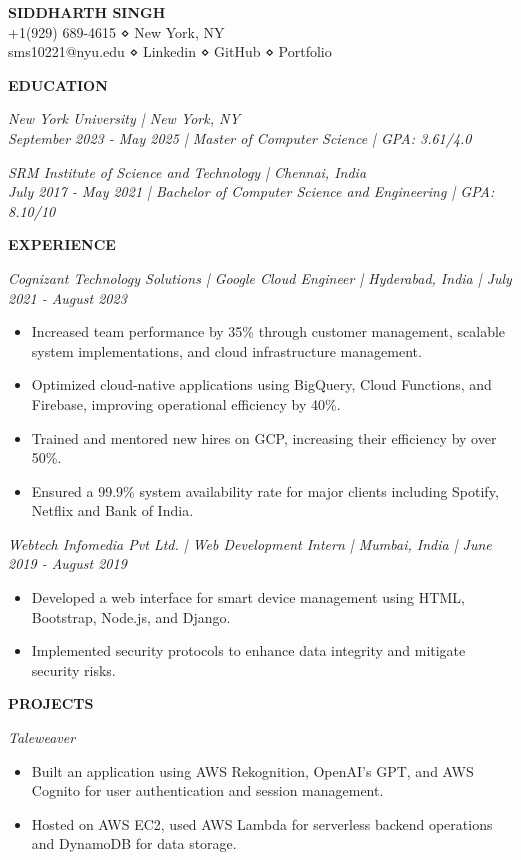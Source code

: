 \documentclass[letterpaper,11pt]{article}
\begin{document}
\noindent
\textbf{\Large SIDDHARTH SINGH} \\
+1(929) 689-4615 ⋄ New York, NY \\
sms10221@nyu.edu ⋄ Linkedin ⋄ GitHub ⋄ Portfolio

\medskip
\noindent
\textbf{EDUCATION}

\noindent
\textit{New York University | New York, NY} \\
\textit{September 2023 - May 2025 | Master of Computer Science | GPA: 3.61/4.0}

\noindent
\textit{SRM Institute of Science and Technology | Chennai, India} \\
\textit{July 2017 - May 2021 | Bachelor of Computer Science and Engineering | GPA: 8.10/10}

\medskip
\noindent
\textbf{EXPERIENCE}

\noindent
\textit{Cognizant Technology Solutions | Google Cloud Engineer | Hyderabad, India | July 2021 - August 2023}
\begin{itemize}[itemsep=1pt]
    \item Increased team performance by 35\% through customer management, scalable system implementations, and cloud infrastructure management.
    \item Optimized cloud-native applications using BigQuery, Cloud Functions, and Firebase, improving operational efficiency by 40\%.
    \item Trained and mentored new hires on GCP, increasing their efficiency by over 50\%.
    \item Ensured a 99.9\% system availability rate for major clients including Spotify, Netflix and Bank of India.
\end{itemize}

\noindent
\textit{Webtech Infomedia Pvt Ltd. | Web Development Intern | Mumbai, India | June 2019 - August 2019}
\begin{itemize}[itemsep=1pt]
    \item Developed a web interface for smart device management using HTML, Bootstrap, Node.js, and Django.
    \item Implemented security protocols to enhance data integrity and mitigate security risks.
\end{itemize}

\medskip
\noindent
\textbf{PROJECTS}

\noindent
\textit{Taleweaver}
\begin{itemize}[itemsep=1pt]
    \item Built an application using AWS Rekognition, OpenAI's GPT, and AWS Cognito for user authentication and session management.
    \item Hosted on AWS EC2, used AWS Lambda for serverless backend operations and DynamoDB for data storage.
\end{itemize}
\end{document}
